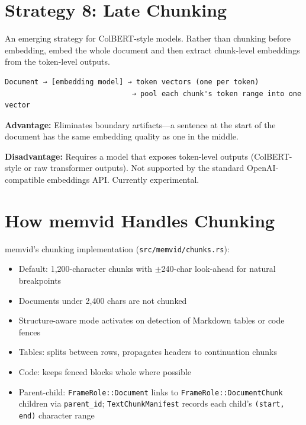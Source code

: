 \section{Strategy 8: Late Chunking}

An emerging strategy for ColBERT-style models. Rather than chunking before embedding, embed
the whole document and then extract chunk-level embeddings from the token-level outputs.

\begin{Verbatim}
Document → [embedding model] → token vectors (one per token)
                              → pool each chunk's token range into one vector
\end{Verbatim}

\textbf{Advantage:} Eliminates boundary artifacts---a sentence at the start of the document
has the same embedding quality as one in the middle.

\textbf{Disadvantage:} Requires a model that exposes token-level outputs (ColBERT-style or raw
transformer outputs). Not supported by the standard OpenAI-compatible embeddings API.
Currently experimental.

\section{How memvid Handles Chunking}

memvid's chunking implementation (\texttt{src/memvid/chunks.rs}):

\begin{itemize}
    \item Default: 1{,}200-character chunks with $\pm$240-char look-ahead for natural breakpoints
    \item Documents under 2{,}400 chars are not chunked
    \item Structure-aware mode activates on detection of Markdown tables or code fences
    \item Tables: splits between rows, propagates headers to continuation chunks
    \item Code: keeps fenced blocks whole where possible
    \item Parent-child: \texttt{FrameRole::Document} links to \texttt{FrameRole::DocumentChunk}
          children via \texttt{parent\_id}; \texttt{TextChunkManifest} records each child's
          \texttt{(start, end)} character range
\end{itemize}


